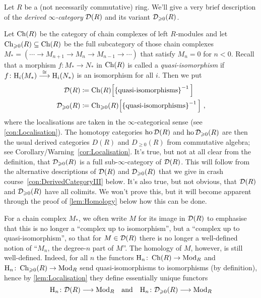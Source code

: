 \begin{numpar}\label{con:DerivedCategoryI}
	Let $R$ be a (not necessarily commutative) ring. We'll give a very brief description of the \emph{derived $\infty$-category} $\mathcal{D}(R)$ and its variant $\mathcal{D}_{\geqslant 0}(R)$.%
	
	Let $\operatorname{Ch}(R)$ be the category of chain complexes of left $R$-modules and let $\operatorname{Ch}_{\geqslant 0}(R)\subseteq \operatorname{Ch}(R)$ be the full subcategory of those chain complexes $M_*=\left(\dotsb \rightarrow M_{n+1}\rightarrow M_n\rightarrow M_{n-1}\rightarrow\dotsb\right)$ that satisfy $M_n=0$ for $n<0$. Recall that a morphism $f\colon M_*\rightarrow N_*$ in $\operatorname{Ch}(R)$ is called a \emph{quasi-isomorphism} if $f\colon \mathrm{H}_i(M_*)\overset{\cong}{\longrightarrow} \mathrm{H}_i(N_*)$ is an isomorphism for all $i$. Then we put
	\begin{align*}
		\Dd(R)&\coloneqq \Ch(R)\lef[\left\{\text{quasi-isomorphisms}\right\}^{-1}\righ]\\
		\Dd_{\geqslant 0}(R)&\coloneqq \Ch_{\geqslant 0}(R)\lef[\left\{\text{quasi-isomorphisms}\right\}^{-1}\righ]\,,
	\end{align*}
	where the localisations are taken in the $\infty$-categorical sense (see \cref{con:Localisation}). The homotopy categories $\operatorname{ho}\mathcal{D}(R)$ and $\operatorname{ho}\mathcal{D}_{\geqslant 0}(R)$ are then the usual derived categories $D(R)$ and $D_{\geqslant 0}(R)$ from commutative algebra; see Corollary/Warning~\cref{cor:Localisation}. It's true, but not at all clear from the definition, that $\mathcal{D}_{\geqslant 0}(R)$ is a full sub-$\infty$-category of $\mathcal{D}(R)$. This will follow from the alternative descriptions of $\mathcal{D}(R)$ and $\mathcal{D}_{\geqslant 0}(R)$ that we give in crash course~\cref{con:DerivedCategoryIII} below. It's also true, but not obvious, that $\mathcal{D}(R)$ and $\mathcal{D}_{\geqslant 0}(R)$ have all colimits. We won't prove this, but it will become apparent through the proof of \cref{lem:Homology} below how this can be done.
	
	For a chain complex $M_*$, we often write $M$ for its image in $\mathcal{D}(R)$ to emphasise that this is no longer a \enquote{complex up to isomorphism}, but a \enquote{complex up to quasi-isomorphism}, so that for $M\in\mathcal{D}(R)$ there is no longer a well-defined notion of \enquote{$M_n$, the degree-$n$ part of $M$}. The homology of $M$, however, is still well-defined. Indeed, for all $n$ the functors $\mathrm{H}_n\colon \operatorname{Ch}(R)\rightarrow \mathrm{Mod}_R$ and $\mathrm{H}_n\colon \operatorname{Ch}_{\geqslant 0}(R)\rightarrow \mathrm{Mod}_R$ send quasi-isomorphisms to isomorphisms (by definition), hence by \cref{lem:Localisation} they define essentially unique functors
	\begin{equation*}
		\mathrm{H}_n\colon\mathcal{D}(R)\longrightarrow\mathrm{Mod}_R\quad\text{and}\quad \mathrm{H}_n\colon\mathcal{D}_{\geqslant 0}(R)\longrightarrow\mathrm{Mod}_R
	\end{equation*}
\end{numpar}

